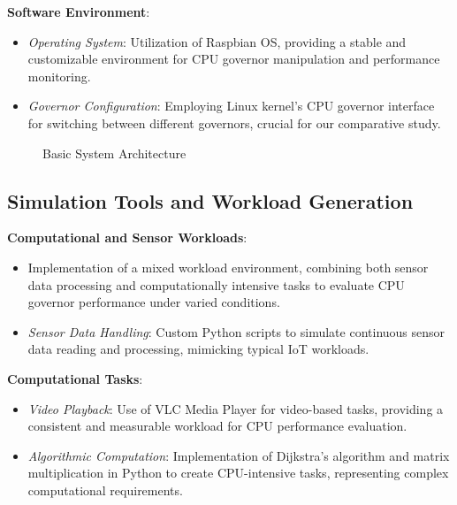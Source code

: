 \documentclass[conference]{IEEEtran}
\begin{document}
\textbf{Software Environment}:
\begin{itemize}
    \item \textit{Operating System}: Utilization of Raspbian OS, providing a stable and customizable environment for CPU governor manipulation and performance monitoring.
    \item \textit{Governor Configuration}: Employing Linux kernel's CPU governor interface for switching between different governors, crucial for our comparative study.
\end{itemize}
\begin{figure}[ht]
\centering
{}
\caption{Basic System Architecture}
\label{fig:sys_arch}
\end{figure}

\subsection{Simulation Tools and Workload Generation}
\textbf{Computational and Sensor Workloads}:
\begin{itemize}
    \item Implementation of a mixed workload environment, combining both sensor data processing and computationally intensive tasks to evaluate CPU governor performance under varied conditions.
    \item \textit{Sensor Data Handling}: Custom Python scripts to simulate continuous sensor data reading and processing, mimicking typical IoT workloads.
\end{itemize}

\textbf{Computational Tasks}:
\begin{itemize}
    \item \textit{Video Playback}: Use of VLC Media Player for video-based tasks, providing a consistent and measurable workload for CPU performance evaluation.
    \item \textit{Algorithmic Computation}: Implementation of Dijkstra’s algorithm and matrix multiplication in Python to create CPU-intensive tasks, representing complex computational requirements.
\end{itemize}
\end{document}
